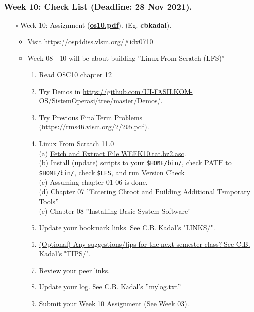 \begin{frame}
\frametitle{Week 10: Check List (Deadline: 28 Nov 2021).}
\begin{itemize}
\item [$\square$] Week 10: Assignment (\href{https://os.vlsm.org/Slides/os10.pdf}{\textbf{os10.pdf}}).
(Eg. \textbf{cbkadal}).
\begin{itemize}
\item Visit \url{https://osp4diss.vlsm.org/\#idx0710}
\item Week 08 - 10 will be about building ''Linux From Scratch (LFS)''
\begin{enumerate}
\item \href{https://www.os-book.com/OS10/slide-dir/}{Read OSC10 chapter 12}
\item Try Demos in {\tiny \url{https://github.com/UI-FASILKOM-OS/SistemOperasi/tree/master/Demos/}}.
\item Try Previous FinalTerm Problems {\tiny (\url{https://rms46.vlsm.org/2/205.pdf})}.
\item \href{https://osp4diss.vlsm.org/W10.html}{Linux From Scratch 11.0} \\
(a) \href{https://os.vlsm.org/WEEK/WEEK10.tar.bz2.asc}{Fetch and Extract File WEEK10.tar.bz2.asc}.\\
(b) Install (update) scripts to your \texttt{\$HOME/bin/},
    check PATH to \texttt{\$HOME/bin/},
    check \texttt{\$LFS}, and
    run Version Check\\
(c) Assuming chapter 01-06 is done.\\
(d) Chapter 07 ''Entering Chroot and Building Additional Temporary Tools''\\
(e) Chapter 08 ''Installing Basic System Software''\\
\item \href{https://cbkadal.github.io/os212/LINKS/}{Update your bookmark links. See C.B. Kadal's "LINKS/"}.
\item \href{https://cbkadal.github.io/os212/TIPS/}{(Optional) Any suggestions/tips for the next semester class? See C.B. Kadal's "TIPS/"}.
\item \href{https://osp4diss.vlsm.org/W02-05.html}{Review your peer links}.
\item \href{https://cbkadal.github.io/os212/TXT/mylog.txt}{Update your log. See C.B. Kadal's ''mylog.txt''}
\item Submit your Week 10 Assignment (\href{https://osp4diss.vlsm.org/W03-06.html}{See Week 03}).
\end{enumerate}
\end{itemize}
\end{itemize}
\end{frame}
